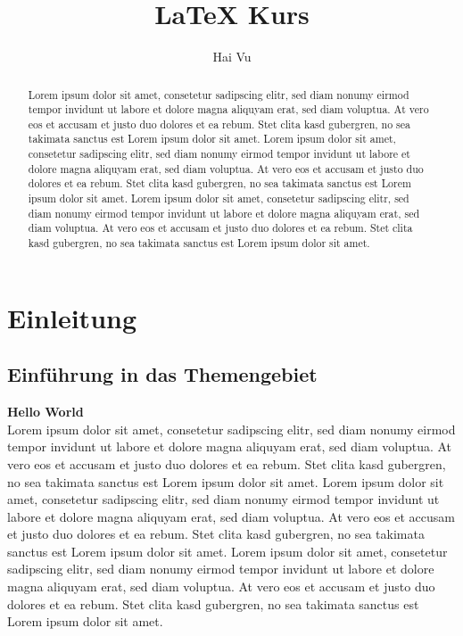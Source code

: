 \documentclass[a4paper, 12pt]{report}
\title{LaTeX Kurs}
\author{Hai Vu}
\begin{document}
	\maketitle
	
	\begin{abstract}
		Lorem ipsum dolor sit amet, consetetur sadipscing elitr, sed diam nonumy eirmod tempor invidunt ut labore et dolore magna aliquyam erat, sed diam voluptua. At vero eos et accusam et justo duo dolores et ea rebum. Stet clita kasd gubergren, no sea takimata sanctus est Lorem ipsum dolor sit amet. Lorem ipsum dolor sit amet, consetetur sadipscing elitr, sed diam nonumy eirmod tempor invidunt ut labore et dolore magna aliquyam erat, sed diam voluptua. At vero eos et accusam et justo duo dolores et ea rebum. Stet clita kasd gubergren, no sea takimata sanctus est Lorem ipsum dolor sit amet. Lorem ipsum dolor sit amet, consetetur sadipscing elitr, sed diam nonumy eirmod tempor invidunt ut labore et dolore magna aliquyam erat, sed diam voluptua. At vero eos et accusam et justo duo dolores et ea rebum. Stet clita kasd gubergren, no sea takimata sanctus est Lorem ipsum dolor sit amet.   
	\end{abstract}

	\begin{doublespace}
		\tableofcontents
	\end{doublespace}	
	
	\chapter{Einleitung}
	\section{Einführung in das Themengebiet} %
	\textbf{Hello World} %
	\\
	Lorem ipsum dolor sit amet, consetetur sadipscing elitr, sed diam nonumy eirmod tempor invidunt ut labore et dolore magna aliquyam erat, sed diam voluptua. At vero eos et accusam et justo duo dolores et ea rebum. Stet clita kasd gubergren, no sea takimata sanctus est Lorem ipsum dolor sit amet. Lorem ipsum dolor sit amet, consetetur sadipscing elitr, sed diam nonumy eirmod tempor invidunt ut labore et dolore magna aliquyam erat, sed diam voluptua. At vero eos et accusam et justo duo dolores et ea rebum. Stet clita kasd gubergren, no sea takimata sanctus est Lorem ipsum dolor sit amet. Lorem ipsum dolor sit amet, consetetur sadipscing elitr, sed diam nonumy eirmod tempor invidunt ut labore et dolore magna aliquyam erat, sed diam voluptua. At vero eos et accusam et justo duo dolores et ea rebum. Stet clita kasd gubergren, no sea takimata sanctus est Lorem ipsum dolor sit amet.
	   	
\end{document}
